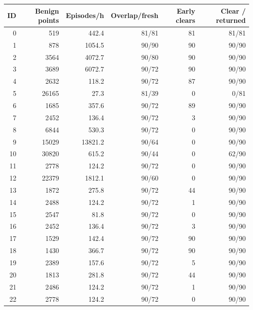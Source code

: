 \begin{tabular}{rrrrrr}
\toprule
ID & Benign points & Episodes/h & Overlap/fresh & Early clears & Clear / returned \\
\midrule
0 & 519 & 442.4 & 81/81 & 81 & 81/81 \\
1 & 878 & 1054.5 & 90/90 & 90 & 90/90 \\
2 & 3564 & 4072.7 & 90/80 & 90 & 90/90 \\
3 & 3689 & 6072.7 & 90/72 & 90 & 90/90 \\
4 & 2632 & 118.2 & 90/72 & 87 & 90/90 \\
5 & 26165 & 27.3 & 81/39 & 0 & 0/81 \\
6 & 1685 & 357.6 & 90/72 & 89 & 90/90 \\
7 & 2452 & 136.4 & 90/72 & 3 & 90/90 \\
8 & 6844 & 530.3 & 90/72 & 0 & 90/90 \\
9 & 15029 & 13821.2 & 90/64 & 0 & 90/90 \\
10 & 30820 & 615.2 & 90/44 & 0 & 62/90 \\
11 & 2778 & 124.2 & 90/72 & 0 & 90/90 \\
12 & 22379 & 1812.1 & 90/60 & 0 & 90/90 \\
13 & 1872 & 275.8 & 90/72 & 44 & 90/90 \\
14 & 2488 & 124.2 & 90/72 & 1 & 90/90 \\
15 & 2547 & 81.8 & 90/72 & 0 & 90/90 \\
16 & 2452 & 136.4 & 90/72 & 3 & 90/90 \\
17 & 1529 & 142.4 & 90/72 & 90 & 90/90 \\
18 & 1430 & 366.7 & 90/72 & 90 & 90/90 \\
19 & 2389 & 157.6 & 90/72 & 5 & 90/90 \\
20 & 1813 & 281.8 & 90/72 & 44 & 90/90 \\
21 & 2486 & 124.2 & 90/72 & 1 & 90/90 \\
22 & 2778 & 124.2 & 90/72 & 0 & 90/90 \\
\bottomrule
\end{tabular}
